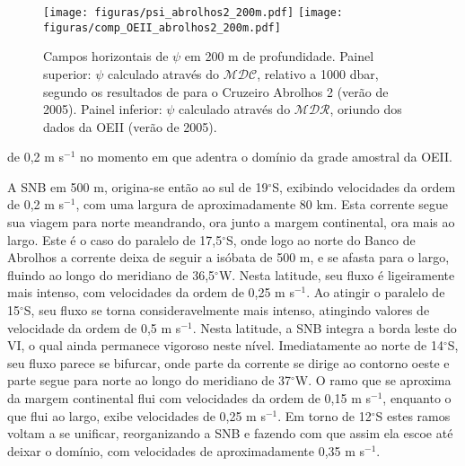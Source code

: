 \begin{figure}%
 \begin{center}
  \texttt{[image: figuras/psi\_abrolhos2\_200m.pdf]}
  \texttt{[image: figuras/comp\_OEII\_abrolhos2\_200m.pdf]}
 \end{center}
 \vspace{-.25cm}
 \renewcommand{\baselinestretch}{1}
 \caption{\label{fig:VAb2} \small Campos horizontais de $\psi$ em 200 m de profundidade.
Painel superior: $\psi$ calculado através do $\mathcal{MDC}$, relativo a 1000 dbar, 
segundo os resultados de \cite{silveira_etal2006B} para o Cruzeiro Abrolhos 2 (verão de 2005).
Painel inferior: $\psi$ calculado através do $\mathcal{MDR}$, oriundo dos dados da OEII (verão de 2005).}
\end{figure}

\hspace{-7mm} de 0,2 m s$^{-1}$ no momento em que adentra o domínio da 
grade amostral da OEII. 

A SNB em 500 m, origina-se então ao sul de 19$^\circ$S, exibindo velocidades da ordem de 0,2 m s$^{-1}$, 
com uma largura de aproximadamente 80 km. Esta corrente segue sua viagem para norte meandrando, ora junto 
a margem continental, ora mais ao largo. Este é o caso do paralelo de 17,5$^\circ$S, onde logo ao norte do 
Banco de Abrolhos a corrente deixa de seguir a isóbata de 500 m, e se afasta para o largo, fluindo ao longo do 
meridiano de 36,5$^\circ$W. Nesta latitude, seu fluxo é ligeiramente mais intenso, com velocidades da 
ordem de 0,25 m s$^{-1}$. Ao atingir o paralelo de 15$^\circ$S, seu fluxo se torna consideravelmente mais
intenso, atingindo valores de velocidade da ordem de 0,5 m s$^{-1}$. Nesta latitude, a SNB integra a borda
leste do VI, o qual ainda permanece vigoroso neste nível. Imediatamente ao norte de 14$^\circ$S, seu fluxo parece
se bifurcar, onde parte da corrente se dirige ao contorno oeste e parte segue para norte ao longo do meridiano 
de 37$^\circ$W. O ramo que se aproxima da margem continental flui com velocidades da ordem de 0,15 m s$^{-1}$, enquanto 
o que flui ao largo, exibe velocidades de 0,25 m s$^{-1}$. Em torno de 12$^\circ$S estes ramos voltam a se unificar,
reorganizando a SNB e fazendo com que assim ela escoe até deixar o domínio, com velocidades de aproximadamente
0,35 m s$^{-1}$. 

